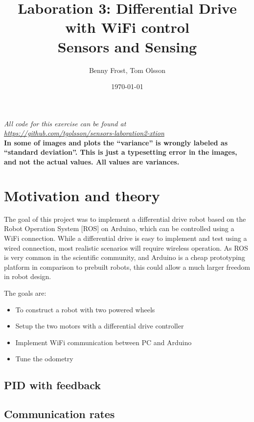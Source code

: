 \documentclass[11pt]{article}
\title{Laboration 3: Differential Drive with WiFi control\\ {\small Sensors and Sensing}} \author{Benny Frost, Tom Olsson}
\date{\today}
\begin{document}
\maketitle %
\begin{center}
  \emph{All code for this exercise can be found at \\ \url{https://github.com/tgolsson/sensors-laboration2-xtion}} \\ \vspace{10pt}
  \textbf{\Large In some of images and plots the ``variance'' is wrongly labeled as
    ``standard deviation''. This is just a typesetting error in the images, and
    not the actual values. All values are variances.}
\end{center}
\tableofcontents
\lstlistoflistings %
\listoffigures %
\listoftables \lstset{
  matchrangestart=t} %


\section{Motivation and theory}
The goal of this project was to implement a differential drive robot based on the Robot Operation System [ROS] on Arduino, which can be controlled using a WiFi connection. While a differential drive is easy to implement and test using a wired connection, most realistic scenarios will require wireless operation. As ROS is very common in the scientific community, and Arduino is a cheap prototyping platform in comparison to prebuilt robots, this could allow a much larger freedom in robot design. \par

The goals are:
\begin{itemize}
\item To construct a robot with two powered wheels
\item Setup the two motors with a differential drive controller
\item Implement WiFi communication between PC and Arduino 
\item Tune the odometry
\end{itemize}
\subsection{PID with feedback}
\subsection{Communication rates}
\label{subsec:cr}
\end{document}
